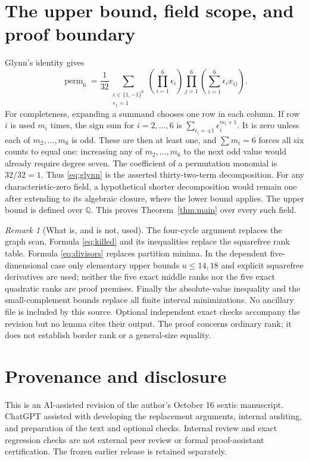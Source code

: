\documentclass[11pt]{amsart}
\theoremstyle{remark}\newtheorem{remark}[theorem]{Remark}
\numberwithin{equation}{section}
\newcommand{\Q}{\mathbb Q}
\newcommand{\perm}{\operatorname{perm}}
\begin{document}
\section{The upper bound, field scope, and proof boundary}
Glynn's identity \cite{Glynn} gives
\begin{equation}\label{eq:glynn}
 \perm_6=\frac1{32}
 \sum_{\substack{\epsilon\in\{1,-1\}^6\\\epsilon_1=1}}
 \left(\prod_{i=1}^6\epsilon_i\right)
 \prod_{j=1}^6\left(\sum_{i=1}^6\epsilon_i x_{ij}\right).
\end{equation}
For completeness, expanding a summand chooses one row in each column.
If row $i$ is used $m_i$ times, the sign sum for $i=2,\ldots,6$ is
$\sum_{\epsilon_i=\pm1}\epsilon_i^{m_i+1}$. It is zero unless each of
$m_2,\ldots,m_6$ is odd. These are then at least one, and
$\sum m_i=6$ forces all six counts to equal one: increasing any of
$m_2,\ldots,m_6$ to the next odd value would already require degree seven.
The coefficient of a permutation monomial is $32/32=1$.
Thus \eqref{eq:glynn} is the asserted thirty-two-term decomposition.
For any characteristic-zero field, a hypothetical shorter decomposition
would remain one after extending to its algebraic closure, where the lower
bound applies. The upper bound is defined over $\Q$. This proves
Theorem~\ref{thm:main} over every such field.

\begin{remark}[What is, and is not, used]
The four-cycle argument replaces the graph scan. Formula
\eqref{eq:killed} and its inequalities replace the squarefree rank table.
Formula \eqref{eq:divisors} replaces partition minima. In the dependent
five-dimensional case only elementary upper bounds $u\le14,18$ and
explicit squarefree derivatives are used; neither the five exact middle
ranks nor the five exact quadratic ranks are proof premises. Finally the
absolute-value inequality and the small-complement bounds replace all
finite interval minimizations. No ancillary file is included by this source.
Optional independent exact checks accompany the revision but no lemma cites
their output. The proof concerns ordinary rank; it does not establish border
rank or a general-size equality.
\end{remark}

\section*{Provenance and disclosure}
This is an AI-assisted revision of the author's October 16 sextic manuscript.
ChatGPT assisted with developing the replacement arguments, internal auditing,
and preparation of the text and optional checks. Internal review and exact
regression checks are not external peer review or formal proof-assistant
certification. The frozen earlier release is retained separately.
\end{document}
